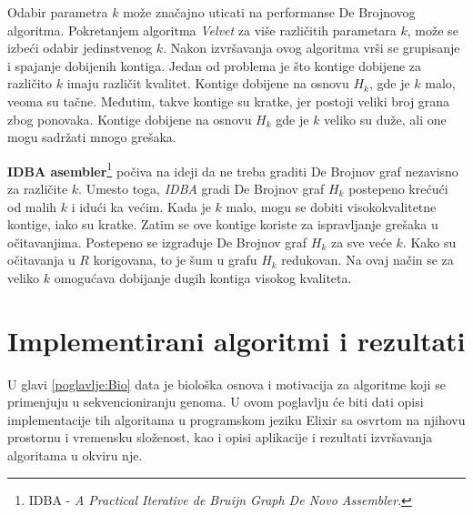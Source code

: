 \documentclass[12pt,oneside]{memoir}
\begin{document}
Odabir parametra $k$ može značajno uticati na performanse De Brojnovog algoritma. Pokretanjem algoritma \textit{Velvet} za više različitih parametara $k$, može se izbeći odabir jedinstvenog $k$. Nakon izvršavanja ovog algoritma vrši se grupisanje i spajanje dobijenih kontiga. Jedan od problema je što kontige dobijene za različito $k$ imaju različit kvalitet. Kontige dobijene na osnovu $H_k$, gde je $k$ malo, veoma su tačne. Međutim, takve kontige su kratke, jer postoji veliki broj grana zbog ponovaka. Kontige dobijene na osnovu $H_k$ gde je $k$ veliko su duže, ali one mogu sadržati mnogo grešaka.

\textbf{IDBA asembler}\footnote{IDBA - \textit{A Practical Iterative de Bruijn Graph De Novo Assembler}.} počiva na ideji da ne treba graditi De Brojnov graf nezavisno za različite $k$. Umesto toga, \textit{IDBA} gradi De Brojnov graf $H_k$ postepeno krećući od malih $k$ i idući ka većim. Kada je $k$ malo, mogu se dobiti visokokvalitetne kontige, iako su kratke. Zatim se ove kontige koriste za ispravljanje grešaka u očitavanjima. Postepeno se izgrađuje De Brojnov graf $H_k$ za sve veće $k$. Kako su očitavanja u $R$ korigovana, to je šum u grafu $H_k$ redukovan. Na ovaj način se za veliko $k$ omogućava dobijanje dugih kontiga visokog kvaliteta. 

\begin{comment}

Na slici \ref{fig:17} se nalazi pseudokod koji opisuje ideju IDBA asemblera.

\begin{figure}[!ht]
\centering
\texttt{[image: Figura5\_24.PNG]}
\caption{IDBA \cite{WingKinSung}}
\label{fig:17}
\end{figure}

\end{comment}

\chapter{Implementirani algoritmi i rezultati}
\label{odeljak:algoritmiIRezultati}

U glavi \ref{poglavlje:Bio} data je biološka osnova i motivacija za algoritme koji se primenjuju u sekvencioniranju genoma. U ovom poglavlju će biti dati opisi implementacije tih algoritama u programskom jeziku Elixir sa osvrtom na njihovu prostornu i vremensku složenost, kao i opisi aplikacije i rezultati izvršavanja algoritama u okviru nje.
\end{document}
